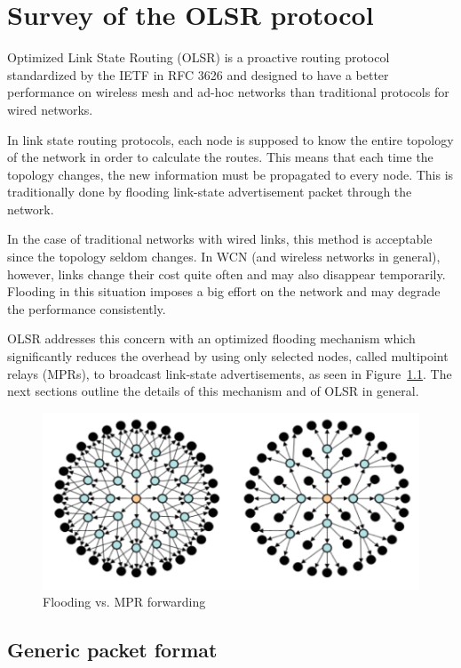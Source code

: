 \documentclass[a4paper,11pt,twoside,openright]{memoir}
\newcommand{\figref}[1] {Figure~\ref{#1}}
\begin{document}
\chapter{Survey of the OLSR protocol}\label{olsr-survey}

Optimized Link State Routing (OLSR) is a proactive routing protocol
standardized by the IETF in RFC 3626\cite{clausen_rfc3626:_2003}
and designed to have a better performance on wireless mesh and ad-hoc
networks than traditional protocols for wired networks.

In link state routing protocols, each node is supposed to know the
entire topology of the network in order to calculate the routes. This
means that each time the topology changes, the new information must be
propagated to every node. This is traditionally done by flooding
link-state advertisement packet through the network.

In the case of traditional networks with wired links, this method is
acceptable since the topology seldom changes. In WCN (and wireless
networks in general), however, links change their cost quite often and
may also disappear temporarily. Flooding in this situation imposes a big
effort on the network and may degrade the performance consistently.

OLSR addresses this concern with an optimized flooding mechanism which
significantly reduces the overhead by using only selected nodes, called
multipoint relays (MPRs), to broadcast link-state advertisements, as seen in
\figref{fig:flood_vs_mpr}. The
next sections outline the details of this mechanism and of OLSR in
general.

\begin{figure}[htbp]
\centering
\includegraphics{images/mpr.png}
\caption{Flooding vs. MPR forwarding}
\label{fig:flood_vs_mpr}
\end{figure}

\section{Generic packet format}\label{generic-packet-format}
\end{document}
